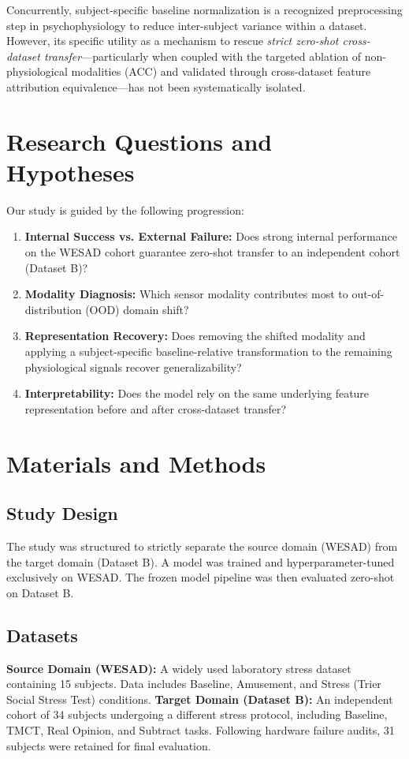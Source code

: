 \documentclass[journal]{IEEEtran}
\begin{document}
Concurrently, subject-specific baseline normalization is a recognized preprocessing step in psychophysiology to reduce inter-subject variance within a dataset. However, its specific utility as a mechanism to rescue \textit{strict zero-shot cross-dataset transfer}—particularly when coupled with the targeted ablation of non-physiological modalities (ACC) and validated through cross-dataset feature attribution equivalence—has not been systematically isolated.

\section{Research Questions and Hypotheses}
Our study is guided by the following progression:
\begin{enumerate}
    \item \textbf{Internal Success vs. External Failure:} Does strong internal performance on the WESAD cohort guarantee zero-shot transfer to an independent cohort (Dataset B)?
    \item \textbf{Modality Diagnosis:} Which sensor modality contributes most to out-of-distribution (OOD) domain shift?
    \item \textbf{Representation Recovery:} Does removing the shifted modality and applying a subject-specific baseline-relative transformation to the remaining physiological signals recover generalizability?
    \item \textbf{Interpretability:} Does the model rely on the same underlying feature representation before and after cross-dataset transfer?
\end{enumerate}

\section{Materials and Methods}

\subsection{Study Design}
The study was structured to strictly separate the source domain (WESAD) from the target domain (Dataset B). A model was trained and hyperparameter-tuned exclusively on WESAD. The frozen model pipeline was then evaluated zero-shot on Dataset B.

\subsection{Datasets}
\textbf{Source Domain (WESAD):} A widely used laboratory stress dataset containing 15 subjects. Data includes Baseline, Amusement, and Stress (Trier Social Stress Test) conditions.
\textbf{Target Domain (Dataset B):} An independent cohort of 34 subjects undergoing a different stress protocol, including Baseline, TMCT, Real Opinion, and Subtract tasks. Following hardware failure audits, 31 subjects were retained for final evaluation.
\end{document}
